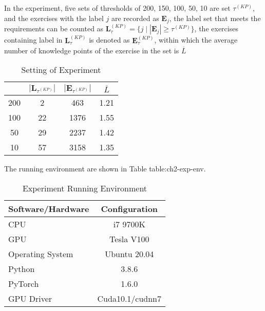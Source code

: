 In the experiment, five sets of thresholds of 200, 150, 100, 50, 10 are set \(\tau^{(KP)} \), and the exercises with the label \(j\) are recorded as \(\mathbf{E}_j\), the label set that meets the requirements can be counted as \(\mathbf{L}_\tau^{(KP)}=\{j\mid |\mathbf{E}_j|\geq\tau^{(KP)}\} \), the exercises containing label in \(\mathbf{L}_\tau^{(KP)} \) is denoted as \(\mathbf{E}_\tau^{(KP)} \), within which the average number of knowledge points of the exercise in the set is \(\overline{L}\)

\begin{table}[htbp!]
	\centering
	\caption{Setting of Experiment}\label{tbl:ch2-ex1}
	\begin{tabular}{cccc}%
		\toprule
		\text{\(\tau^{(KP)} \)} & \(|\mathbf{L}_{\tau^{(KP)}}|\) & \(|\mathbf{E}_{\tau^{(KP)}}| \) & \(\overline{L}\) \\
		\midrule
		200                     & 2                              & 463                             & 1.21             \\
		100                     & 22                             & 1376                            & 1.55             \\
		50                      & 29                             & 2237                            & 1.42             \\
		10                      & 57                             & 3158                            & 1.35             \\
		\bottomrule
	\end{tabular}
\end{table}

The running environment are shown in Table {table:ch2-exp-env}.

\begin{table}[htbp!]
	\caption{Experiment Running Environment}\label{table:ch2-exp-env}
	\centering
	\begin{tabular}{l c}
		\toprule
		Software/Hardware & Configuration   \\
		\midrule
		CPU               & i7 9700K        \\

		GPU               & Tesla V100      \\

		Operating System  & Ubuntu 20.04    \\

		Python            & 3.8.6           \\

		PyTorch           & 1.6.0           \\

		GPU Driver        & Cuda10.1/cudnn7 \\
		\bottomrule
	\end{tabular}
\end{table}


